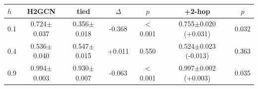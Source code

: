 \begin{tabular}{lcccccc}
\toprule
$h$ & H2GCN & tied & $\Delta$ & $p$ & +2-hop & $p$ \\
\midrule
0.1 & 0.724$\pm$0.037 & 0.356$\pm$0.018 & -0.368 & $<$0.001 & 0.755$\pm$0.020 (+0.031) & 0.032 \\
0.4 & 0.536$\pm$0.040 & 0.547$\pm$0.015 & +0.011 & 0.550 & 0.524$\pm$0.023 (-0.013) & 0.363 \\
0.9 & 0.994$\pm$0.003 & 0.930$\pm$0.007 & -0.063 & $<$0.001 & 0.997$\pm$0.002 (+0.003) & 0.035 \\
\bottomrule
\end{tabular}